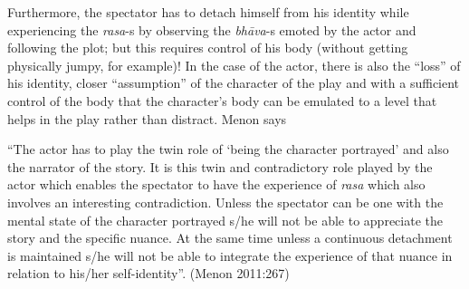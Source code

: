 Furthermore, the spectator has to detach himself from his identity while experiencing the \textsl{rasa}-s by observing the \textsl{bhāva}-s emoted by the actor and following the plot; but this requires control of his body (without getting physically jumpy, for example)! In the case of the actor, there is also the “loss” of his identity, closer “assumption” of the character of the play and with a sufficient control of the body that the character’s body can be emulated to a level that helps in the play rather than distract. Menon says 

\begin{myquote}
“The actor has to play the twin role of ‘being the character portrayed’ and also the narrator of the story. It is this twin and contradictory role played by the actor which enables the spectator to have the experience of \textsl{rasa} which also involves an interesting contradiction. Unless the spectator can be one with the mental state of the character portrayed s/he will not be able to appreciate the story and the specific nuance. At the same time unless a continuous detachment is maintained s/he will not be able to integrate the experience of that nuance in relation to his/her self-identity”. 
\hfill(Menon 2011:267)
\end{myquote}


